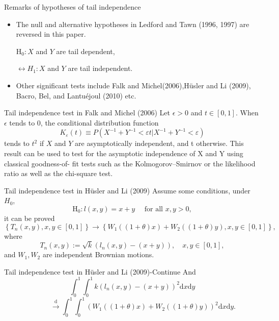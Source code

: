 \documentclass[12pt]{beamer}
\begin{document}
\begin{frame}{Remarks of hypotheses of tail independence}
\begin{itemize}
\item The null and alternative hypotheses in Ledford and Tawn (1996,
1997) are reversed in this paper.
\begin{center}
$\mathrm{H}_{0}: X$ and $Y$ are tail dependent,

$\leftrightarrow H_{1}: X$ and $Y$ are tail independent.
\end{center}

\vspace{3ex}
\item Other significant tests include Falk and Michel(2006),Hüsler and Li (2009), Bacro, Bel, and Lantuéjoul (2010) etc.
\end{itemize}
\end{frame}

\begin{frame}{Tail independence test in Falk and Michel (2006)}
Let $\epsilon>0$ and $t\in [0,1]$. When $\epsilon$ tends to 0, the conditional distribution function
$$K_{\varepsilon}(t) \equiv P\left(X^{-1}+Y^{-1}<\varepsilon t | X^{-1}+Y^{-1}<\varepsilon\right)$$
tends to $t^2$ if $X$ and $Y$ are asymptotically independent, and t otherwise. This result can
be used to test for the asymptotic independence of X and Y using classical goodness-of-
fit tests such as the Kolmogorov–Smirnov or the likelihood ratio as well as the
chi-square test.
\end{frame}


\begin{frame}{Tail independence test in Hüsler and Li (2009) }
Assume some conditions, under $H_0$,
$$\mathrm{H}_{0}: l(x, y)=x+y \quad \text { for all } x, y>0,$$
it can be proved
$$\left\{T_{n}(x, y), x, y \in[0,1]\right\} \rightarrow\left\{W_{1}((1+\theta) x)+W_{2}((1+\theta) y), x, y \in[0,1]\right\},$$
where 
$$T_{n}(x, y):=\sqrt{k}\left(l_{n}(x, y)-(x+y)\right), \quad x, y \in[0,1],$$
and $W_1, W_2$ are independent Brownian motions.
\end{frame}
\begin{frame}{Tail independence test in Hüsler and Li (2009)-Continue }
And
$$\int_{0}^{1} \int_{0}^{1} k\left(l_{n}(x, y)-(x+y)\right)^{2} \mathrm{d} x \mathrm{d} y$$
$$ \quad \quad \quad  \stackrel{\mathrm{d}}{\rightarrow} \int_{0}^{1} \int_{0}^{1}\left(W_{1}((1+\theta) x)+W_{2}((1+\theta) y)\right)^{2} \mathrm{d} x \mathrm{d} y.$$
\end{frame}
\end{document}
